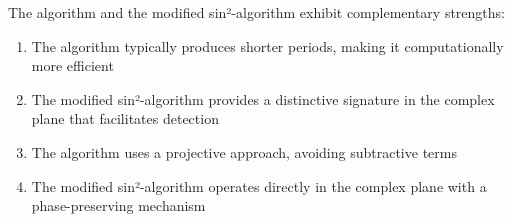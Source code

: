 \begin{proposition}
The \HAPD{} algorithm and the modified sin²-algorithm exhibit complementary strengths:
\begin{enumerate}
    \item The \HAPD{} algorithm typically produces shorter periods, making it computationally more efficient
    \item The modified sin²-algorithm provides a distinctive signature in the complex plane that facilitates detection
    \item The \HAPD{} algorithm uses a projective approach, avoiding subtractive terms
    \item The modified sin²-algorithm operates directly in the complex plane with a phase-preserving mechanism
\end{enumerate}
\end{proposition}

